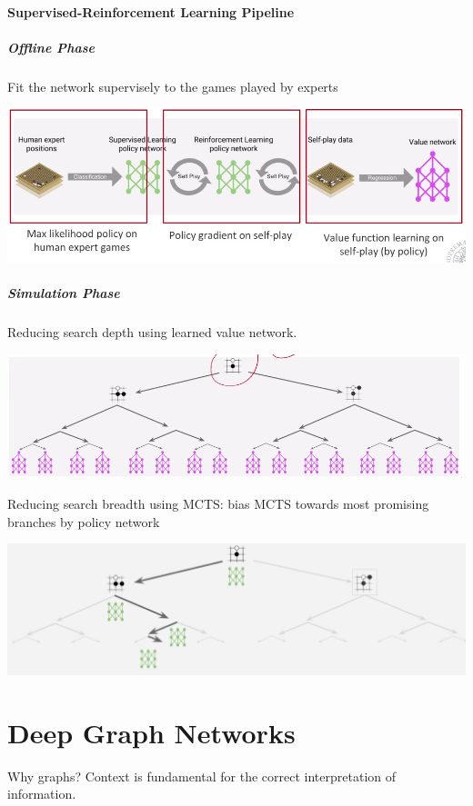 \documentclass[10pt]{report}
\begin{document}
\paragraph{Supervised-Reinforcement Learning Pipeline}
\subparagraph{Offline Phase} Fit the network supervisely to the games played by experts
\begin{center}
	\includegraphics[scale=0.5]{188.png}
\end{center}
\subparagraph{Simulation Phase} Reducing search depth using learned value network.
\begin{center}
	\includegraphics[scale=0.5]{189.png}
\end{center}
Reducing search breadth using MCTS: bias MCTS towards most promising branches by policy network
\begin{center}
	\includegraphics[scale=0.5]{208.png}
\end{center}
\pagebreak
\section{Deep Graph Networks}
Why graphs? Context is fundamental for the correct interpretation of information.
\end{document}
